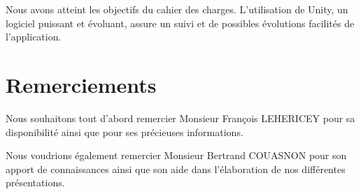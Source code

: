 \documentclass[a4paper,11pt]{article}
\begin{document}
		Nous avons atteint les objectifs du cahier des charges. L'utilisation de Unity, un logiciel puissant et évoluant, assure un suivi et de possibles évolutions facilités de l'application.

	
	\section{Remerciements}
		Nous souhaitons tout d'abord remercier Monsieur François LEHERICEY pour sa disponibilité ainsi que pour ses précieuses informations.
		
		Nous voudrions également remercier Monsieur Bertrand COUASNON pour son apport de connaissances ainsi que son aide dans l'élaboration de nos différentes présentations.
	
\end{document}
